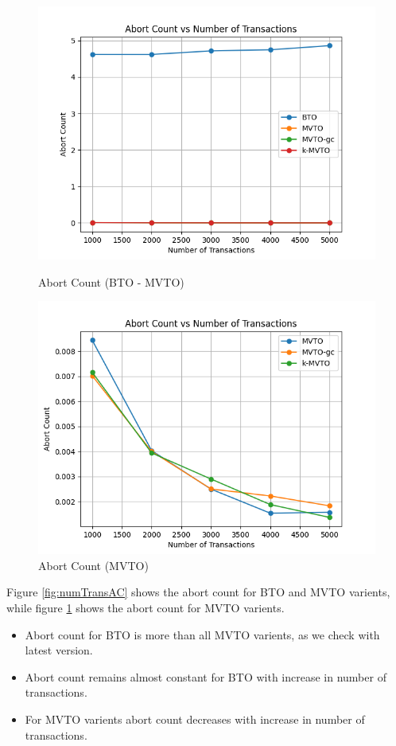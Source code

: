 \documentclass[12pt]{article}
\begin{document}
\begin{figure}[h]
    \centering
    \begin{minipage}[b]{0.45\textwidth}
        \includegraphics[width=\textwidth]{./images/NumTransAC.png}
        \caption{Abort Count (BTO - MVTO)}
        \label{fig:numTransAC}
    \end{minipage}
    \hfill
    \begin{minipage}[b]{0.45\textwidth}
        \includegraphics[width=\textwidth]{./images/MVTOnumTransAC.png}
        \caption{Abort Count (MVTO)}
        \label{fig:MVTOnumTransAC}
    \end{minipage}
\end{figure}
Figure \ref{fig:numTransAC} shows the abort count for BTO and MVTO varients, while figure \ref{fig:MVTOnumTransAC} shows the abort count for MVTO varients.
\begin{itemize}
    \item Abort count for BTO is more than all MVTO varients, as we check with latest version.
    \item Abort count remains almost constant for BTO with increase in number of transactions.
    \item For MVTO varients abort count decreases with increase in number of transactions.
\end{itemize}
\end{document}
